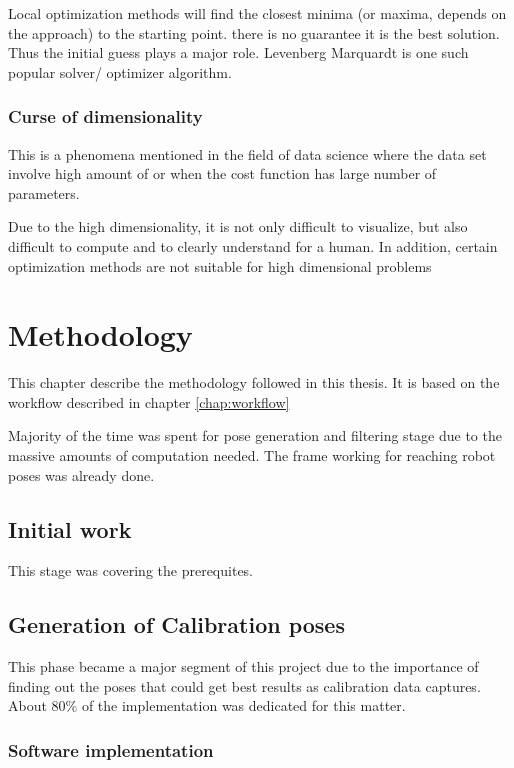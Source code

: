 \documentclass[english, printversion, nomenclature, notitle]{tuvisionthesis} %
\begin{document}
Local optimization methods will find the closest minima (or maxima, depends on the approach) to the starting point. there is no guarantee it is the best solution. Thus the initial guess plays a major role. Levenberg Marquardt is one such popular solver/ optimizer algorithm.


\subsection{Curse of dimensionality}
This is a phenomena mentioned in the field of data science where the data set involve high amount of or when the cost function has large number of parameters.

Due to the high dimensionality, it is not only difficult to visualize, but also difficult to compute and to clearly understand for a human. In addition, certain optimization methods are not suitable for high dimensional problems 

\chapter{Methodology}
\label{chap:methodology}
This chapter describe the methodology followed in this thesis. It is based on the workflow described in chapter \cref{chap:workflow}

Majority of the time was spent for pose generation and filtering stage due to the massive amounts of computation needed. The frame working for reaching robot poses was already done. 

\section{Initial work}

This stage was covering the prerequites.

\section{Generation of Calibration poses}
This phase became a major segment of this project due to the importance of finding out the poses that could get best results as calibration data captures. About 80\% of the implementation was dedicated for this matter.

\subsection{Software implementation}
\end{document}
